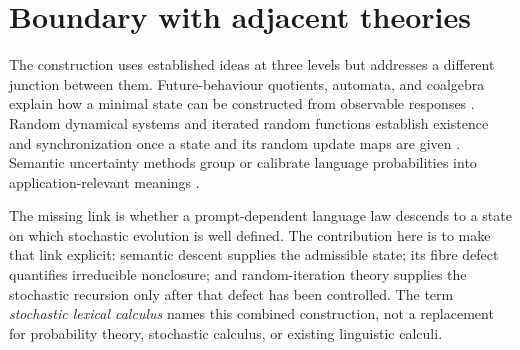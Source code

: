 \documentclass[11pt]{article}
\begin{document}
\section{Boundary with adjacent theories}

The construction uses established ideas at three levels but addresses a
different junction between them.  Future-behaviour quotients, automata, and
coalgebra explain how a minimal state can be constructed from observable
responses \cite{jacobs2023,rutten2000}.  Random dynamical systems and iterated
random functions establish existence and synchronization once a state and its
random update maps are given \cite{arnold1998,diaconis1999}.  Semantic
uncertainty methods group or calibrate language probabilities into
application-relevant meanings \cite{farquhar2024,kuhn2023}.

The missing link is whether a prompt-dependent language law descends to a
state on which stochastic evolution is well defined.  The contribution here
is to make that link explicit: semantic descent supplies the admissible state;
its fibre defect quantifies irreducible nonclosure; and random-iteration
theory supplies the stochastic recursion only after that defect has been
controlled.  The term \emph{stochastic lexical calculus} names this combined
construction, not a replacement for probability theory, stochastic calculus,
or existing linguistic calculi.
\end{document}
